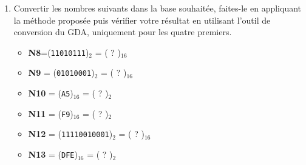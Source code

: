 \documentclass{article}
\begin{document}
\begin{enumerate}
	\item Convertir les nombres suivants dans la base souhaitée, faites-le en appliquant la méthode proposée
		puis vérifier votre résultat en utilisant l'outil de conversion du GDA, uniquement pour les quatre premiers.
		\begin{itemize}
			\item \textbf{N8}=(\texttt{11010111})$_{2}$ = ( ? )$_{16}$\\
\vspace{1em}
\begin{Form}
	\TextField[name=r148,width=\linewidth,height=2.5em,multiline=true,default=N8=]{}
\end{Form}
			\item \textbf{N9} = (\texttt{01010001})$_{2}$ = ( ? )$_{16}$\\
\vspace{1em}
\begin{Form}
	\TextField[name=r149,width=\linewidth,height=2.5em,multiline=true,default=N9=]{}
\end{Form}
			\item \textbf{N10} = (\texttt{A5})$_{16}$ = ( ? )$_{2}$\\
\vspace{1em}
\begin{Form}
	\TextField[name=r1410,width=\linewidth,height=2.5em,multiline=true,default=N10=]{}
\end{Form}
			\item \textbf{N11} = (\texttt{F9})$_{16}$  = ( ? )$_{2}$\\
\vspace{1em}
\begin{Form}
	\TextField[name=r1411,width=\linewidth,height=2.5em,multiline=true,default=N11=]{}
\end{Form}
			\item \textbf{N12} = (\texttt{11110010001})$_{2}$ = ( ? )$_{16}$\\
\vspace{1em}
\begin{Form}
	\TextField[name=r1412,width=\linewidth,height=2.5em,multiline=true,default=N12=]{}
\end{Form}
			\item \textbf{N13} = (\texttt{DFE})$_{16}$ = ( ? )$_{2}$\\
\vspace{1em}
\begin{Form}
	\TextField[name=r1413,width=\linewidth,height=2.5em,multiline=true,default=N13=]{}
\end{Form}
		\end{itemize}


\end{enumerate}
\end{document}
